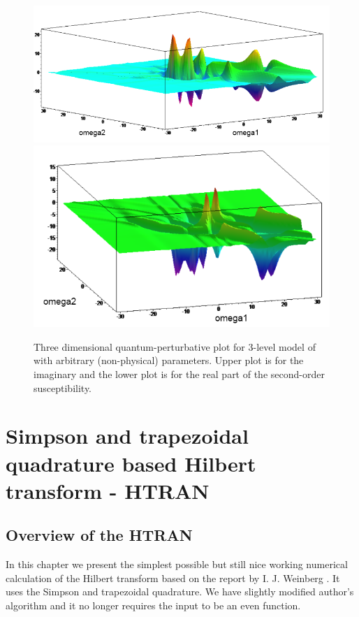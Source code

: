\documentclass[12pt,twoside,a4paper]{article}
\numberwithin{equation}{subsection}
\numberwithin{figure}{subsection}
\begin{document}
\begin{figure} 
  \includegraphics[width=150mm]{img/qp_3da.png} \\
  \includegraphics[width=150mm]{img/qp_3db.png}
  \caption{Three dimensional quantum-perturbative plot for 3-level model of with arbitrary (non-physical) parameters. Upper plot is for the
  imaginary and the lower plot is for the real part of the second-order susceptibility.
  \label{fig:qp_3d}}
\end{figure}
   
\section{Simpson and trapezoidal quadrature based Hilbert transform - HTRAN} \label{chap:htran}

\subsection{Overview of the HTRAN} \label{chap:htran_overview}

In this chapter we present the simplest possible but still nice working numerical calculation of the Hilbert transform based on the report
by I. J. Weinberg \cite{weinberg_hilbert}. It uses the Simpson and trapezoidal quadrature. We have slightly modified author's algorithm and
it no longer requires the input to be an even function.
\end{document}
